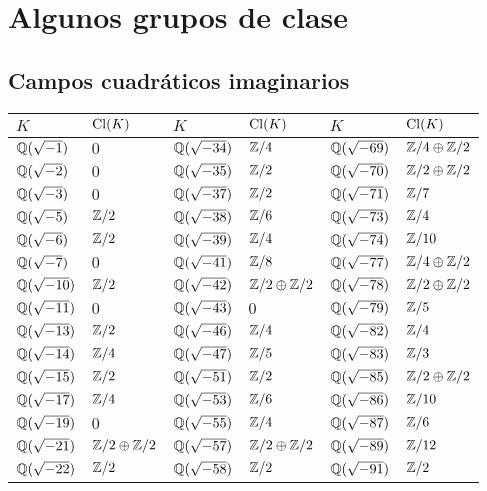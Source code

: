 \chapter{Algunos grupos de clase}


\section{Campos cuadráticos imaginarios}

\begin{center}
\renewcommand{\arraystretch}{1.5}
\begin{tabular}{x{2cm}x{2.5cm}x{2cm}x{2.5cm}x{2cm}x{2.5cm}}
\hline
$K$ & $\operatorname{Cl} (K)$ & $K$ & $\operatorname{Cl} (K)$ & $K$ & $\operatorname{Cl} (K)$ \tabularnewline\hline
$\mathbb{Q} (\sqrt{-1})$ & $0$ & $\mathbb{Q} (\sqrt{-34})$ & $\mathbb{Z}/4$ & $\mathbb{Q} (\sqrt{-69})$ & $\mathbb{Z}/4\oplus\mathbb{Z}/2$ \tabularnewline\hline
$\mathbb{Q} (\sqrt{-2})$ & $0$ & $\mathbb{Q} (\sqrt{-35})$ & $\mathbb{Z}/2$ & $\mathbb{Q} (\sqrt{-70})$ & $\mathbb{Z}/2\oplus\mathbb{Z}/2$ \tabularnewline\hline
$\mathbb{Q} (\sqrt{-3})$ & $0$ & $\mathbb{Q} (\sqrt{-37})$ & $\mathbb{Z}/2$ & $\mathbb{Q} (\sqrt{-71})$ & $\mathbb{Z}/7$ \tabularnewline\hline
$\mathbb{Q} (\sqrt{-5})$ & $\mathbb{Z}/2$ & $\mathbb{Q} (\sqrt{-38})$ & $\mathbb{Z}/6$ & $\mathbb{Q} (\sqrt{-73})$ & $\mathbb{Z}/4$ \tabularnewline\hline
$\mathbb{Q} (\sqrt{-6})$ & $\mathbb{Z}/2$ & $\mathbb{Q} (\sqrt{-39})$ & $\mathbb{Z}/4$ & $\mathbb{Q} (\sqrt{-74})$ & $\mathbb{Z}/10$ \tabularnewline\hline
$\mathbb{Q} (\sqrt{-7})$ & $0$ & $\mathbb{Q} (\sqrt{-41})$ & $\mathbb{Z}/8$ & $\mathbb{Q} (\sqrt{-77})$ & $\mathbb{Z}/4\oplus\mathbb{Z}/2$ \tabularnewline\hline
$\mathbb{Q} (\sqrt{-10})$ & $\mathbb{Z}/2$ & $\mathbb{Q} (\sqrt{-42})$ & $\mathbb{Z}/2\oplus\mathbb{Z}/2$ & $\mathbb{Q} (\sqrt{-78})$ & $\mathbb{Z}/2\oplus\mathbb{Z}/2$ \tabularnewline\hline
$\mathbb{Q} (\sqrt{-11})$ & $0$ & $\mathbb{Q} (\sqrt{-43})$ & $0$ & $\mathbb{Q} (\sqrt{-79})$ & $\mathbb{Z}/5$ \tabularnewline\hline
$\mathbb{Q} (\sqrt{-13})$ & $\mathbb{Z}/2$ & $\mathbb{Q} (\sqrt{-46})$ & $\mathbb{Z}/4$ & $\mathbb{Q} (\sqrt{-82})$ & $\mathbb{Z}/4$ \tabularnewline\hline
$\mathbb{Q} (\sqrt{-14})$ & $\mathbb{Z}/4$ & $\mathbb{Q} (\sqrt{-47})$ & $\mathbb{Z}/5$ & $\mathbb{Q} (\sqrt{-83})$ & $\mathbb{Z}/3$ \tabularnewline\hline
$\mathbb{Q} (\sqrt{-15})$ & $\mathbb{Z}/2$ & $\mathbb{Q} (\sqrt{-51})$ & $\mathbb{Z}/2$ & $\mathbb{Q} (\sqrt{-85})$ & $\mathbb{Z}/2\oplus\mathbb{Z}/2$ \tabularnewline\hline
$\mathbb{Q} (\sqrt{-17})$ & $\mathbb{Z}/4$ & $\mathbb{Q} (\sqrt{-53})$ & $\mathbb{Z}/6$ & $\mathbb{Q} (\sqrt{-86})$ & $\mathbb{Z}/10$ \tabularnewline\hline
$\mathbb{Q} (\sqrt{-19})$ & $0$ & $\mathbb{Q} (\sqrt{-55})$ & $\mathbb{Z}/4$ & $\mathbb{Q} (\sqrt{-87})$ & $\mathbb{Z}/6$ \tabularnewline\hline
$\mathbb{Q} (\sqrt{-21})$ & $\mathbb{Z}/2\oplus\mathbb{Z}/2$ & $\mathbb{Q} (\sqrt{-57})$ & $\mathbb{Z}/2\oplus\mathbb{Z}/2$ & $\mathbb{Q} (\sqrt{-89})$ & $\mathbb{Z}/12$ \tabularnewline\hline
$\mathbb{Q} (\sqrt{-22})$ & $\mathbb{Z}/2$ & $\mathbb{Q} (\sqrt{-58})$ & $\mathbb{Z}/2$ & $\mathbb{Q} (\sqrt{-91})$ & $\mathbb{Z}/2$ \tabularnewline\hline

\end{tabular}
\end{center}

